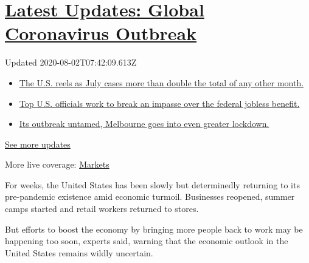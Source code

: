 \hypertarget{latest-updates-global-coronavirus-outbreak}{%
\section{\texorpdfstring{\href{https://www.nytimes.com/2020/08/01/world/coronavirus-covid-19.html?action=click\&pgtype=Article\&state=default\&region=MAIN_CONTENT_1\&context=storylines_live_updates}{Latest
Updates: Global Coronavirus
Outbreak}}{Latest Updates: Global Coronavirus Outbreak}}\label{latest-updates-global-coronavirus-outbreak}}

Updated 2020-08-02T07:42:09.613Z

\begin{itemize}
\tightlist
\item
  \href{https://www.nytimes.com/2020/08/01/world/coronavirus-covid-19.html?action=click\&pgtype=Article\&state=default\&region=MAIN_CONTENT_1\&context=storylines_live_updates\#link-34047410}{The
  U.S. reels as July cases more than double the total of any other
  month.}
\item
  \href{https://www.nytimes.com/2020/08/01/world/coronavirus-covid-19.html?action=click\&pgtype=Article\&state=default\&region=MAIN_CONTENT_1\&context=storylines_live_updates\#link-780ec966}{Top
  U.S. officials work to break an impasse over the federal jobless
  benefit.}
\item
  \href{https://www.nytimes.com/2020/08/01/world/coronavirus-covid-19.html?action=click\&pgtype=Article\&state=default\&region=MAIN_CONTENT_1\&context=storylines_live_updates\#link-2bc8948}{Its
  outbreak untamed, Melbourne goes into even greater lockdown.}
\end{itemize}

\href{https://www.nytimes.com/2020/08/01/world/coronavirus-covid-19.html?action=click\&pgtype=Article\&state=default\&region=MAIN_CONTENT_1\&context=storylines_live_updates}{See
more updates}

More live coverage:
\href{https://www.nytimes.com/live/2020/07/31/business/stock-market-today-coronavirus?action=click\&pgtype=Article\&state=default\&region=MAIN_CONTENT_1\&context=storylines_live_updates}{Markets}

For weeks, the United States has been slowly but determinedly returning
to its pre-pandemic existence amid economic turmoil. Businesses
reopened, summer camps started and retail workers returned to stores.

But efforts to boost the economy by bringing more people back to work
may be happening too soon, experts said, warning that the economic
outlook in the United States remains wildly uncertain.


